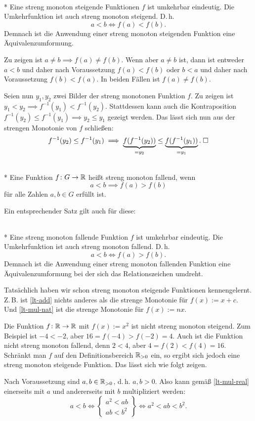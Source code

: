 \begin{Satz}%
%
\mbox{}\\*
Eine streng monoton steigende Funktionen $f$ ist umkehrbar eindeutig.
Die Umkehrfunktion ist auch streng monoton steigend. D.\,h.
\[a<b\iff f(a)<f(b).\]
Demnach ist die Anwendung einer streng monoton steigenden
Funktion eine Äquivalenzumformung.
\end{Satz}
\noindent{}
Zu zeigen ist $a\ne b\implies f(a)\ne f(b)$. Wenn aber $a\ne b$
ist, dann ist entweder $a<b$ und daher nach Voraussetzung
$f(a)<f(b)$ oder $b<a$ und daher nach Voraussetzung $f(b)<f(a)$.
In beiden Fällen ist $f(a)\ne f(b)$.

Seien nun $y_1,y_2$ zwei Bilder der streng monotonen Funktion $f$.
Zu zeigen ist $y_1<y_2\implies f^{-1}(y_1)<f^{-1}(y_2)$.
Stattdessen kann auch die Kontraposition
$f^{-1}(y_2)\le f^{-1}(y_1)\implies y_2\le y_1$ gezeigt werden.
Das lässt sich nun aus der strengen Monotonie von $f$ schließen:
\begin{equation}
f^{-1}(y_2)\le f^{-1}(y_1)\implies
\underbrace{f(f^{-1}(y_2))}_{=y_2}\le \underbrace{f(f^{-1}(y_1))}_{=y_1}.\;\Box
\end{equation}

\begin{Definition}\mbox{}\\*
Eine Funktion $f\colon G\to\mathbb R$ heißt streng monoton fallend, wenn
\[a<b\implies f(a)>f(b)\]
für alle Zahlen $a,b\in G$ erfüllt ist.
\end{Definition}

\noindent
Ein entsprechender Satz gilt auch für diese:
\begin{Satz}\mbox{}\\*
Eine streng monoton fallende Funktion $f$ ist umkehrbar eindeutig.
Die Umkehrfunktion ist auch streng monoton fallend. D.\,h.
\[a<b\iff f(a)>f(b).\]
Demnach ist die Anwendung einer streng monoton fallenden
Funktion eine Äquivalenzumformung bei der sich das
Relationszeichen umdreht.
\end{Satz}

\noindent
Tatsächlich haben wir schon streng monoton steigende Funktionen
kennengelernt. Z.\,B. ist \eqref{lt-add} nichts anderes als die strenge
Monotonie für $f(x):=x+c$. Und \eqref{lt-mul-nat} ist die strenge
Monotonie für $f(x):=nx$.

Die Funktion $f\colon\mathbb R\to\mathbb R$ mit $f(x):=x^2$ ist nicht streng monoton
steigend. Zum Beispiel ist $-4<-2$, aber $16=f(-4)>f(-2)=4$. Auch
ist die Funktion nicht streng monoton fallend, denn $2<4$,
aber $4=f(2)<f(4)=16$. Schränkt man $f$
auf den Definitionsbereich $\mathbb R_{>0}$ ein, so ergibt sich jedoch eine
streng monoton steigende Funktion. Das lässt sich wie folgt zeigen.

Nach Voraussetzung sind $a,b\in\mathbb R_{>0}$, d.\,h. $a,b>0$.
Also kann gemäß \eqref{lt-mul-real} einerseits mit $a$
und andererseits mit $b$ multipliziert werden:
\[
a<b\iff\begin{Bmatrix}
a^2<ab\\
ab<b^2
\end{Bmatrix}
\iff a^2<ab<b^2.
\]
